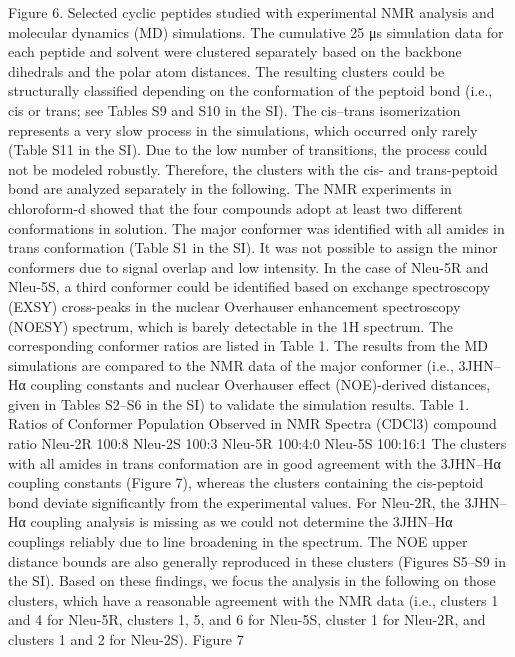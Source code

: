 Figure 6. Selected cyclic peptides studied with experimental NMR analysis and molecular dynamics (MD) simulations.
The cumulative 25 μs simulation data for each peptide and solvent were clustered separately based on the backbone dihedrals and the polar atom distances. The resulting clusters could be structurally classified depending on the conformation of the peptoid bond (i.e., cis or trans; see Tables S9 and S10 in the SI). The cis–trans isomerization represents a very slow process in the simulations, which occurred only rarely (Table S11 in the SI). Due to the low number of transitions, the process could not be modeled robustly. Therefore, the clusters with the cis- and trans-peptoid bond are analyzed separately in the following.
The NMR experiments in chloroform-d showed that the four compounds adopt at least two different conformations in solution. The major conformer was identified with all amides in trans conformation (Table S1 in the SI). It was not possible to assign the minor conformers due to signal overlap and low intensity. In the case of Nleu-5R and Nleu-5S, a third conformer could be identified based on exchange spectroscopy (EXSY) cross-peaks in the nuclear Overhauser enhancement spectroscopy (NOESY) spectrum, which is barely detectable in the 1H spectrum. The corresponding conformer ratios are listed in Table 1. The results from the MD simulations are compared to the NMR data of the major conformer (i.e., 3JHN–Hα coupling constants and nuclear Overhauser effect (NOE)-derived distances, given in Tables S2–S6 in the SI) to validate the simulation results.
Table 1. Ratios of Conformer Population Observed in NMR Spectra (CDCl3)
compound	ratio
Nleu-2R	100:8
Nleu-2S	100:3
Nleu-5R	100:4:0
Nleu-5S	100:16:1
The clusters with all amides in trans conformation are in good agreement with the 3JHN–Hα coupling constants (Figure 7), whereas the clusters containing the cis-peptoid bond deviate significantly from the experimental values. For Nleu-2R, the 3JHN–Hα coupling analysis is missing as we could not determine the 3JHN–Hα couplings reliably due to line broadening in the spectrum. The NOE upper distance bounds are also generally reproduced in these clusters (Figures S5–S9 in the SI). Based on these findings, we focus the analysis in the following on those clusters, which have a reasonable agreement with the NMR data (i.e., clusters 1 and 4 for Nleu-5R, clusters 1, 5, and 6 for Nleu-5S, cluster 1 for Nleu-2R, and clusters 1 and 2 for Nleu-2S).
Figure 7

